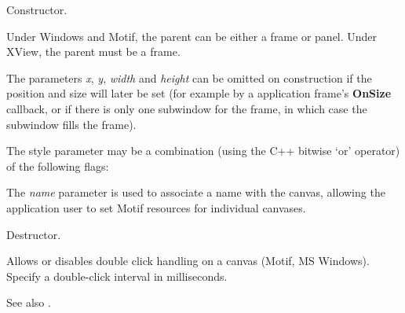 \label{constrcanvas}


Constructor.

Under Windows and Motif, the parent can be either a frame or panel.
Under XView, the parent must be a frame.

The parameters {\it x}, {\it y}, {\it width} and {\it height}
can be omitted on construction if the position and size will later
be set (for example by a application frame's {\bf OnSize} callback,
or if there is only one subwindow for the frame, in which case the
subwindow fills the frame).

The style parameter may be a combination (using the C++
bitwise `or' operator) of the following flags:

\begin{twocollist}\itemsep=0pt
\end{twocollist}

The {\it name} parameter is used to associate a name with the canvas,
allowing the application user to set Motif resources for individual
canvases.



Destructor.

\label{allowdoubleclick}


Allows or disables double click handling on a canvas (Motif, MS Windows).
Specify a double-click interval in milliseconds.

See also .

